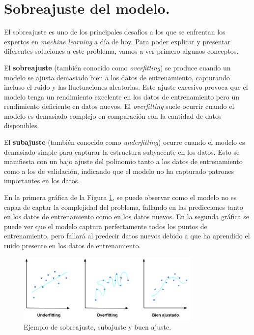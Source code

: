 \section{Sobreajuste del modelo.}

El sobreajuste es uno de los principales desafíos a los que se enfrentan los expertos en \textit{machine learning} a día de hoy. Para poder explicar y presentar diferentes soluciones a este problema, vamos a ver primero algunos conceptos.


El \textbf{sobreajuste} (también conocido como \textit{overfitting}) se produce cuando un modelo se ajusta demasiado bien a los datos de entrenamiento, capturando incluso el ruido y las fluctuaciones aleatorias. Este ajuste excesivo provoca que el modelo tenga un rendimiento excelente en los datos de entrenamiento pero un rendimiento deficiente en datos nuevos. El \textit{overfitting} suele ocurrir cuando el modelo es demasiado complejo en comparación con la cantidad de datos disponibles.

El \textbf{subajuste} (también conocido como \textit{underfitting}) ocurre cuando el modelo es demasiado simple para capturar la estructura subyacente en los datos. Esto se manifiesta con un bajo ajuste del polinomio tanto a los datos de entrenamiento como a los de validación, indicando que el modelo no ha capturado patrones importantes en los datos.

En la primera gráfica de la Figura \ref{fig:overfitting}, se puede observar como el modelo no es capaz de captar la complejidad del problema, fallando en las predicciones tanto en los datos de entrenamiento como en los datos nuevos. En la segunda gráfica se puede ver que el modelo captura perfectamente todos los puntos de entrenamiento, pero fallará al predecir datos nuevos debido a que ha aprendido el ruido presente en los datos de entrenamiento.

\begin{figure}[h!]
    \centering
    \includegraphics[width=0.8\textwidth]{img/overfitting.png}
    \caption{Ejemplo de sobreajuste, subajuste y buen ajuste.}
    \label{fig:overfitting}
\end{figure}

